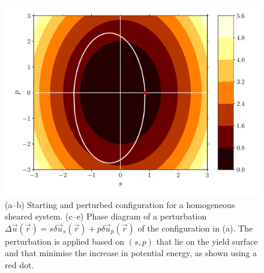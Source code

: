 \documentclass[fleqn]{goose-article}
\begin{document}
\begin{figure}[htp]
\begin{minipage}[t]{.31\textwidth}
        \includegraphics[width=\textwidth]{example_prestress_phase-diagram_energy-contour.pdf}
    \end{minipage}
    \caption{
        (a--b) Starting and perturbed configuration for a homogeneous sheared system.
        (c--e) Phase diagram of a perturbation
        $\Delta \vec{u}(\vec{r}) = s \delta \vec{u}_s (\vec{r}) + p \delta \vec{u}_p (\vec{r})$
        of the configuration in (a).
        The perturbation is applied based on $(s, p)$ that lie on the yield surface and
        that minimise the increase in potential
        energy, as shown using a red dot.
    }
    \label{fig:example:prestress}
\end{figure}
\end{document}
